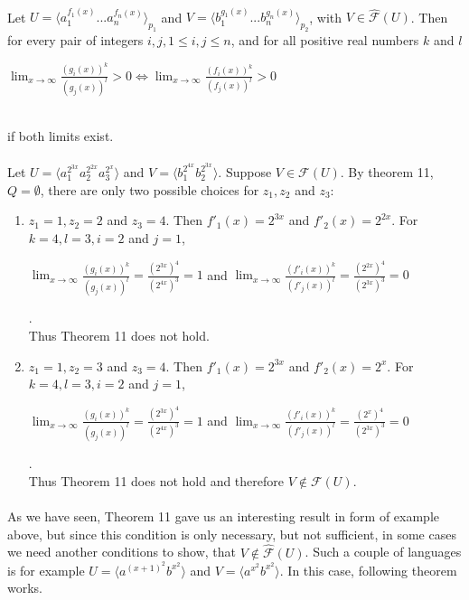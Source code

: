 \paragraph{}
\cdosledok Let $U = \langle a_{1}^{f_{1}(x)}...a_{n}^{f_{n}(x)} \rangle_{p_{1}} $ and $V = \langle b_{1}^{g_{1}(x)}...b_{n}^{g_{n}(x)} \rangle_{p_{2}} $, with $V \in \hat{\mathcal{F}}(U) $. Then for every pair of integers $i, j, 1\leq i, j \leq n$, and for all positive real numbers $k$ and $l$ \\
\centerline{$\lim_{x \to \infty}\frac{(g_{i}(x))^{k}}{(g_{j}(x))^{l}} > 0 \Leftrightarrow \lim_{x \to \infty}\frac{(f_{i}(x))^{k}}{(f_{j}(x))^{l}} > 0$} \\
if both limits exist.

\paragraph{}
\priklad Let $U = \langle a_{1}^{2^{3x}}a_{2}^{2^{2x}}a_{3}^{2^{x}} \rangle $ and $V = \langle b_{1}^{2^{4x}}b_{2}^{2^{3x}} \rangle $. Suppose $V \in \mathcal{F}(U)$. By theorem 11, $Q = \emptyset $, there are only two possible choices for $z_{1}, z_{2}$ and $z_{3}$:
\begin{enumerate}
\item $z_{1} = 1, z_{2} = 2 $ and $z_{3} = 4$. Then $f'_{1}(x) = 2^{3x}$ and $f'_{2}(x) = 2^{2x}$. For $k = 4, l = 3, i = 2$ and $j = 1$,\\
\centerline{$\lim_{x \to \infty}\frac{(g_{i}(x))^{k}}{(g_{j}(x))^{l}} = \frac{(2^{3x})^{4}}{(2^{4x})^{3}} = 1$ and $\lim_{x \to \infty}\frac{(f'_{i}(x))^{k}}{(f'_{j}(x))^{l}} = \frac{(2^{2x})^{4}}{(2^{3x})^{3}} = 0$}.\\
Thus Theorem 11 does not hold.
\item $z_{1} = 1, z_{2} = 3 $ and $z_{3} = 4$. Then $f'_{1}(x) = 2^{3x}$ and $f'_{2}(x) = 2^{x}$. For $k = 4, l = 3, i = 2$ and $j = 1$,\\
\centerline{$\lim_{x \to \infty}\frac{(g_{i}(x))^{k}}{(g_{j}(x))^{l}} = \frac{(2^{3x})^{4}}{(2^{4x})^{3}} = 1$ and $\lim_{x \to \infty}\frac{(f'_{i}(x))^{k}}{(f'_{j}(x))^{l}} = \frac{(2^{x})^{4}}{(2^{3x})^{3}} = 0$}.\\
Thus Theorem 11 does not hold and therefore $V \notin \mathcal{F}(U)$.
\end{enumerate}

\paragraph{}
As we have seen, Theorem 11 gave us an interesting result in form of example above, but since this condition is only necessary, but not sufficient, in some cases we need another conditions to show, that $V \notin \hat{\mathcal{F}}(U)$. Such a couple of languages is for example $U = \langle a^{(x+1)^{2}}b^{x^{2}}\rangle $ and $V = \langle a^{x^{2}}b^{x^{2}}\rangle $. In this case, following theorem works.


